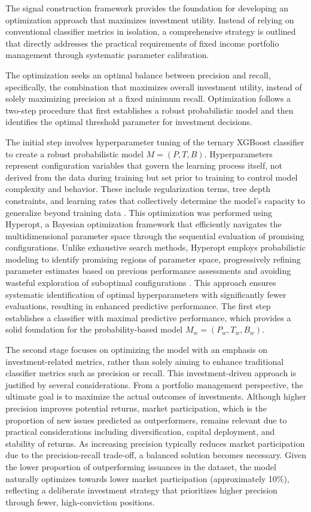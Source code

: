 The signal construction framework provides the foundation for developing an optimization approach that maximizes investment utility. Instead of relying on conventional classifier metrics in isolation, a comprehensive strategy is outlined that directly addresses the practical requirements of fixed income portfolio management through systematic parameter calibration.

The optimization seeks an optimal balance between precision and recall, specifically, the combination that maximizes overall investment utility, instead of solely maximizing precision at a fixed minimum recall. Optimization follows a two-step procedure that first establishes a robust probabilistic model and then identifies the optimal threshold parameter for investment decisions.

The initial step involves hyperparameter tuning of the ternary XGBoost classifier to create a robust probabilistic model $M = (P, T, B)$. Hyperparameters represent configuration variables that govern the learning process itself, not derived from the data during training but set prior to training to control model complexity and behavior. These include regularization terms, tree depth constraints, and learning rates that collectively determine the model's capacity to generalize beyond training data \parencite[p.40]{Harrison2023EffectiveModels}. This optimization was performed using Hyperopt, a Bayesian optimization framework that efficiently navigates the multidimensional parameter space through the sequential evaluation of promising configurations. Unlike exhaustive search methods, Hyperopt employs probabilistic modeling to identify promising regions of parameter space, progressively refining parameter estimates based on previous performance assessments and avoiding wasteful exploration of suboptimal configurations \parencite[pp. 85-87]{Harrison2023EffectiveModels}. This approach ensures systematic identification of optimal hyperparameters with significantly fewer evaluations, resulting in enhanced predictive performance. The first step establishes a classifier with maximal predictive performance, which provides a solid foundation for the probability-based model $M_w = (P_w, T_w, B_w)$.

The second stage focuses on optimizing the model with an emphasis on investment-related metrics, rather than solely aiming to enhance traditional classifier metrics such as precision or recall. This investment-driven approach is justified by several considerations. From a portfolio management perspective, the ultimate goal is to maximize the actual outcomes of investments. Although higher precision improves potential returns, market participation, which is the proportion of new issues predicted as outperformers, remains relevant due to practical considerations including diversification, capital deployment, and stability of returns. As increasing precision typically reduces market participation due to the precision-recall trade-off, a balanced solution becomes necessary. Given the lower proportion of outperforming issuances in the dataset, the model naturally optimizes towards lower market participation (approximately 10\%), reflecting a deliberate investment strategy that prioritizes higher precision through fewer, high-conviction positions.

